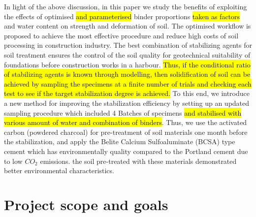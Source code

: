 \documentclass[sustainability,article,submit,pdftex,moreauthors]{Definitions/mdpi}
\begin{document}

In light of the above discussion, in this paper we study the benefits of exploiting the effects of optimised \hl{and parameterised }binder proportions \hl{taken as factors }and water content on strength and deformation of soil. The optimised workflow is proposed to achieve the most effective procedure and reduce high costs of soil processing in construction industry. The best combination of stabilizing agents for soil treatment ensures the control of the soil quality for geotechnical suitability of foundations before construction works in a harbour. \hl{Thus, if the conditional ratio of stabilizing agents is known through modelling, then solidification of soil can be achieved by sampling the specimens at a finite number of trials and checking each test to see if the target stabilization degree is achieved. }To this end, we introduce a new method for improving the stabilization efficiency by setting up an updated sampling procedure which included 4 Batches of specimens \hl{and stabilised with various amount of water and combination of binders}. Thus, we use the activated carbon (powdered charcoal) for pre-treatment of soil materials one month before the stabilization, and apply the Belite Calcium Sulfoaluminate (BCSA) type cement which has environmentally quality compared to the Portland cement due to low $CO_2$ emissions. the soil pre-treated with these materials demonstrated better environmental characteristics. 

\section{Project scope and goals}
\end{document}
